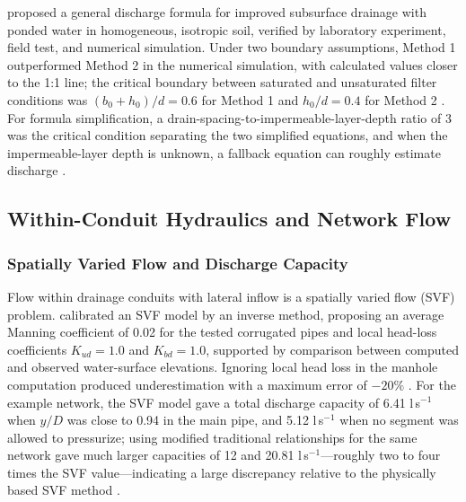 \documentclass[11pt]{article}
\begin{document}
\textcite{Tao2019} proposed a general discharge formula for improved subsurface drainage
with ponded water in homogeneous, isotropic soil, verified by laboratory experiment, field
test, and numerical simulation. Under two boundary assumptions, Method 1 outperformed
Method 2 in the numerical simulation, with calculated values closer to the 1:1 line; the
critical boundary between saturated and unsaturated filter conditions was
$(b_0 + h_0)/d = 0.6$ for Method 1 and $h_0/d = 0.4$ for Method 2 \parencite{Tao2019}. For
formula simplification, a drain-spacing-to-impermeable-layer-depth ratio of 3 was the
critical condition separating the two simplified equations, and when the impermeable-layer
depth is unknown, a fallback equation can roughly estimate discharge \parencite{Tao2019}.

\subsection{Within-Conduit Hydraulics and Network Flow}

\subsubsection{Spatially Varied Flow and Discharge Capacity}

Flow within drainage conduits with lateral inflow is a spatially varied flow (SVF)
problem. \textcite{Bayat2011} calibrated an SVF model by an inverse method, proposing an
average Manning coefficient of 0.02 for the tested corrugated pipes and local head-loss
coefficients $K_{ud} = 1.0$ and $K_{bd} = 1.0$, supported by comparison between computed
and observed water-surface elevations. Ignoring local head loss in the manhole computation
produced underestimation with a maximum error of $-20\%$ \parencite{Bayat2011}. For the
example network, the SVF model gave a total discharge capacity of 6.41 l\,s$^{-1}$ when
$y/D$ was close to 0.94 in the main pipe, and 5.12 l\,s$^{-1}$ when no segment was allowed
to pressurize; using modified traditional relationships for the same network gave much
larger capacities of 12 and 20.81 l\,s$^{-1}$---roughly two to four times the SVF
value---indicating a large discrepancy relative to the physically based SVF method
\parencite{Bayat2011}.
\end{document}

